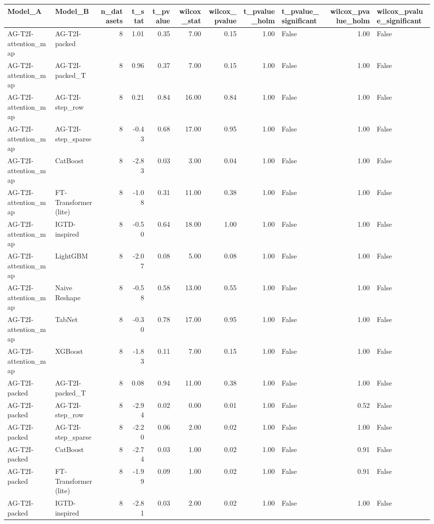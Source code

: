 \begin{tabular}{llrrrrrrlrl}
\toprule
Model_A & Model_B & n_datasets & t_stat & t_pvalue & wilcox_stat & wilcox_pvalue & t_pvalue_holm & t_pvalue_significant & wilcox_pvalue_holm & wilcox_pvalue_significant \\
\midrule
AG-T2I-attention_map & AG-T2I-packed & 8 & 1.01 & 0.35 & 7.00 & 0.15 & 1.00 & False & 1.00 & False \\
AG-T2I-attention_map & AG-T2I-packed_T & 8 & 0.96 & 0.37 & 7.00 & 0.15 & 1.00 & False & 1.00 & False \\
AG-T2I-attention_map & AG-T2I-step_row & 8 & 0.21 & 0.84 & 16.00 & 0.84 & 1.00 & False & 1.00 & False \\
AG-T2I-attention_map & AG-T2I-step_sparse & 8 & -0.43 & 0.68 & 17.00 & 0.95 & 1.00 & False & 1.00 & False \\
AG-T2I-attention_map & CatBoost & 8 & -2.83 & 0.03 & 3.00 & 0.04 & 1.00 & False & 1.00 & False \\
AG-T2I-attention_map & FT-Transformer (lite) & 8 & -1.08 & 0.31 & 11.00 & 0.38 & 1.00 & False & 1.00 & False \\
AG-T2I-attention_map & IGTD-inspired & 8 & -0.50 & 0.64 & 18.00 & 1.00 & 1.00 & False & 1.00 & False \\
AG-T2I-attention_map & LightGBM & 8 & -2.07 & 0.08 & 5.00 & 0.08 & 1.00 & False & 1.00 & False \\
AG-T2I-attention_map & Naive Reshape & 8 & -0.58 & 0.58 & 13.00 & 0.55 & 1.00 & False & 1.00 & False \\
AG-T2I-attention_map & TabNet & 8 & -0.30 & 0.78 & 17.00 & 0.95 & 1.00 & False & 1.00 & False \\
AG-T2I-attention_map & XGBoost & 8 & -1.83 & 0.11 & 7.00 & 0.15 & 1.00 & False & 1.00 & False \\
AG-T2I-packed & AG-T2I-packed_T & 8 & 0.08 & 0.94 & 11.00 & 0.38 & 1.00 & False & 1.00 & False \\
AG-T2I-packed & AG-T2I-step_row & 8 & -2.94 & 0.02 & 0.00 & 0.01 & 1.00 & False & 0.52 & False \\
AG-T2I-packed & AG-T2I-step_sparse & 8 & -2.20 & 0.06 & 2.00 & 0.02 & 1.00 & False & 1.00 & False \\
AG-T2I-packed & CatBoost & 8 & -2.74 & 0.03 & 1.00 & 0.02 & 1.00 & False & 0.91 & False \\
AG-T2I-packed & FT-Transformer (lite) & 8 & -1.99 & 0.09 & 1.00 & 0.02 & 1.00 & False & 0.91 & False \\
AG-T2I-packed & IGTD-inspired & 8 & -2.81 & 0.03 & 2.00 & 0.02 & 1.00 & False & 1.00 & False \\

\end{tabular}
